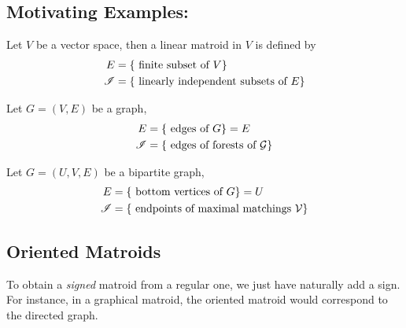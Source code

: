 \subsection{Motivating Examples:}

\begin{definition}
    Let $V$ be a vector space, then a linear matroid in $V$ is defined by
    \begin{equation*}
        \begin{split}
            E & = \lbrace \text{ finite subset of } V \rbrace \\
            \mathscr{I} & = \lbrace \text{ linearly independent subsets of } E \rbrace
        \end{split}
    \end{equation*}
\end{definition}

\begin{definition}
    Let $G = (V, E)$ be a graph,
    \begin{equation*}
        \begin{split}
            E & = \lbrace \text{ edges of } G \rbrace = E \\
            \mathscr{I} & = \lbrace \text{ edges of forests of } \mathcal{G} \rbrace
        \end{split}
    \end{equation*}
\end{definition}

\begin{definition}
    Let $G = (U, V, E)$ be a bipartite graph,
    \begin{equation*}
        \begin{split}
            E & = \lbrace \text{ bottom vertices of } G \rbrace = U \\
            \mathscr{I} & = \lbrace \text{ endpoints of maximal matchings } \mathcal{V} \rbrace
        \end{split}
    \end{equation*}
\end{definition}

\subsection{Oriented Matroids}

To obtain a \textit{signed} matroid from a regular one, we just have naturally add a sign.
For instance, in a graphical matroid, the oriented matroid would correspond to the directed graph.

